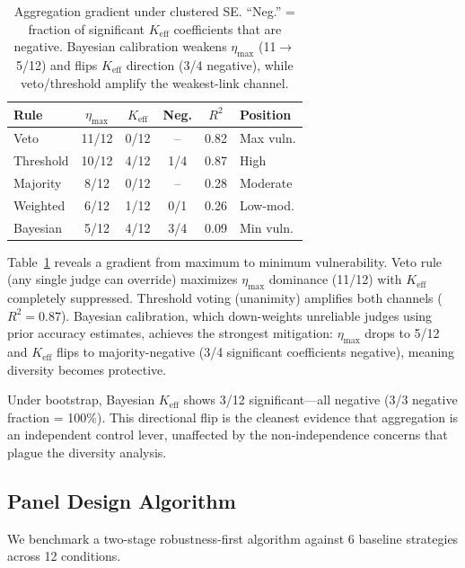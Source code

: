 \documentclass[11pt,a4paper]{article}
\begin{document}
\begin{table}[t]
\centering
\small
\begin{tabular}{lccccl}
\toprule
\textbf{Rule} & \textbf{$\eta_{\max}$} & \textbf{$K_{\text{eff}}$} & \textbf{Neg.} & \textbf{$R^2$} & \textbf{Position} \\
\midrule
Veto & 11/12 & 0/12 & -- & 0.82 & Max vuln. \\
Threshold & 10/12 & 4/12 & 1/4 & 0.87 & High \\
Majority & 8/12 & 0/12 & -- & 0.28 & Moderate \\
Weighted & 6/12 & 1/12 & 0/1 & 0.26 & Low-mod. \\
Bayesian & 5/12 & 4/12 & 3/4 & 0.09 & Min vuln. \\
\bottomrule
\end{tabular}
\caption{Aggregation gradient under clustered SE. ``Neg.'' = fraction of significant $K_{\text{eff}}$ coefficients that are negative. Bayesian calibration weakens $\eta_{\max}$ (11$\to$5/12) and flips $K_{\text{eff}}$ direction (3/4 negative), while veto/threshold amplify the weakest-link channel.}
\label{tab:aggregation}
\end{table}

Table~\ref{tab:aggregation} reveals a gradient from maximum to minimum vulnerability. Veto rule (any single judge can override) maximizes $\eta_{\max}$ dominance (11/12) with $K_{\text{eff}}$ completely suppressed. Threshold voting (unanimity) amplifies both channels ($R^2 = 0.87$). Bayesian calibration, which down-weights unreliable judges using prior accuracy estimates, achieves the strongest mitigation: $\eta_{\max}$ drops to 5/12 and $K_{\text{eff}}$ flips to majority-negative (3/4 significant coefficients negative), meaning diversity becomes protective.

Under bootstrap, Bayesian $K_{\text{eff}}$ shows 3/12 significant---all negative (3/3 negative fraction = 100\%). This directional flip is the cleanest evidence that aggregation is an independent control lever, unaffected by the non-independence concerns that plague the diversity analysis.

\subsection{Panel Design Algorithm}
\label{sec:design}

We benchmark a two-stage robustness-first algorithm against 6 baseline strategies across 12 conditions.
\end{document}
